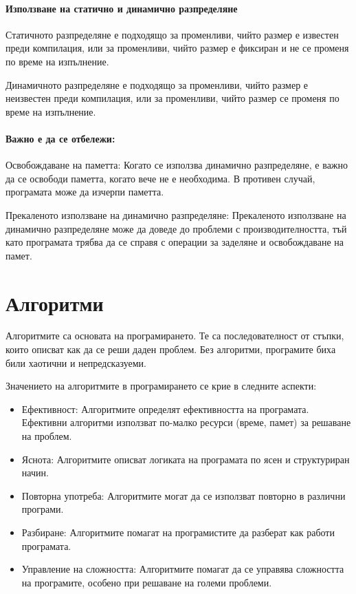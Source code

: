 \documentclass[oneside]{book}
\begin{document}
\subsubsection{Използване на статично и динамично разпределяне}
Статичното разпределяне е подходящо за променливи, чийто размер е известен преди компилация, или за променливи, чийто размер е фиксиран и не се променя по време на изпълнение.

Динамичното разпределяне е подходящо за променливи, чийто размер е неизвестен преди компилация, или за променливи, чийто размер се променя по време на изпълнение.

\subsubsection{Важно е да се отбележи:}
Освобождаване на паметта: Когато се използва динамично разпределяне, е важно да се освободи паметта, когато вече не е необходима. В противен случай, програмата може да изчерпи паметта.

Прекаленото използване на динамично разпределяне: Прекаленото използване на динамично разпределяне може да доведе до проблеми с производителността, тъй като програмата трябва да се справя с операции за заделяне и освобождаване на памет.

\chapter{Алгоритми}
Алгоритмите са основата на програмирането. Те са последователност от стъпки, които описват как да се реши даден проблем. Без алгоритми, програмите биха били хаотични и непредсказуеми.

Значението на алгоритмите в програмирането се крие в следните аспекти:
\begin{itemize}
    \item Ефективност: Алгоритмите определят ефективността на програмата. Ефективни алгоритми използват по-малко ресурси (време, памет) за решаване на проблем.
    \item Яснота: Алгоритмите описват логиката на програмата по ясен и структуриран начин.
    \item Повторна употреба: Алгоритмите могат да се използват повторно в различни програми.
    \item Разбиране: Алгоритмите помагат на програмистите да разберат как работи програмата.
    \item Управление на сложността: Алгоритмите помагат да се управява сложността на програмите, особено при решаване на големи проблеми.
\end{itemize}
\end{document}
